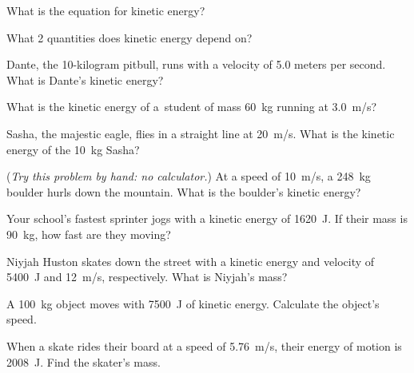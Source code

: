 \documentclass{article}
\numberwithin{equation}{section}
\numberwithin{figure}{section}
\begin{document}
\begin{exercise}
    What is the equation for kinetic energy?
\end{exercise}

\begin{exercise}
    What 2 quantities does kinetic energy depend on?
\end{exercise}

\begin{exercise} \label{taHSMX}
    Dante, the 10-kilogram pitbull, runs with a velocity of 5.0 meters per second. What is Dante's kinetic energy?
\end{exercise}


\begin{exercise} \label{QRI2H9}
    What is the kinetic energy of a student of mass \SI{60}{kg} running at \SI{3.0}{m/s}?
\end{exercise}


\begin{exercise} \label{ixc46e}
    Sasha, the majestic eagle, flies in a straight line at \SI{20}{m/s}. What is the kinetic energy of the \SI{10}{kg} Sasha? 
\end{exercise}


\begin{exercise} \label{dguWEr}
    (\textit{Try this problem by hand: no calculator.}) At a speed of \SI{10}{m/s}, a \SI{248}{kg} boulder hurls down the mountain. What is the boulder's kinetic energy?
\end{exercise}

\begin{exercise} \label{rUr2P8}
    Your school's fastest sprinter jogs with a kinetic energy of \SI{1620}{J}. If their mass is \SI{90}{kg}, how fast are they moving?
\end{exercise}

\begin{exercise} \label{2rrR9W}
    Niyjah Huston skates down the street with a kinetic energy and velocity of \SI{5400}{J} and \SI{12}{m/s}, respectively. What is Niyjah's mass?
\end{exercise}

\begin{exercise} \label{gHlhnM}
    A \SI{100}{kg} object moves with \SI{7500}{J} of kinetic energy. Calculate the object's speed.
\end{exercise}

\begin{exercise} \label{WH6xot}
    When a skate rides their board at a speed of \SI{5.76}{m/s}, their energy of motion is \SI{2008}{J}. Find the skater's mass.
\end{exercise}
\end{document}
